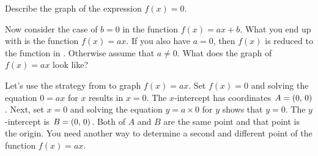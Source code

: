 \documentclass[a4paper,oneside,12pt]{article}
\begin{document}

\begin{exercise}
\label{ex:constant_function_zero}
Describe the graph of the expression $f(x) = 0$.
\end{exercise}


Now consider the case of $b = 0$ in the function $f(x) = ax + b$.
What you end up with is the function $f(x) = ax$.  If you also have
$a = 0$, then $f(x)$ is reduced to the function in
.  Otherwise assume that
$a \neq 0$.  What does the graph of $f(x) = ax$ look like?

Let's use the strategy from  to graph
$f(x) = ax$.  Set $f(x) = 0$ and solving the equation $0 = ax$ for $x$
results in $x = 0$.  The $x$-intercept has coordinates
$A = \left\lparen{0},\, {0}\right\rparen$.  Next, set $x = 0$ and solving the equation
$y = a \times 0$ for $y$ shows that $y = 0$.  The $y$-intercept is
$B = \left\lparen{0},\, {0}\right\rparen$.  Both of $A$ and $B$ are the same point and that
point is the origin.  You need another way to determine a second and
different point of the function $f(x) = ax$.
\end{document}
